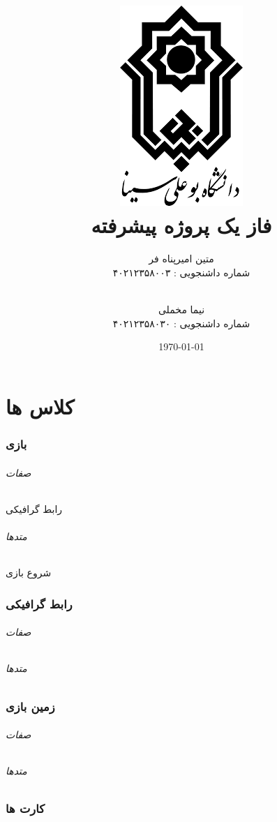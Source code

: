 \documentclass[pdf,titlepage,a4paper]{report}
\title{\includegraphics[scale=0.5]{Graphics/BASU_Logo_header.png} \\ \Huge{فاز یک پروژه پیشرفته}}
\author{متین امیرپناه فر \\ شماره داشنجویی : ۴۰۲۱۲۳۵۸۰۰۳  \and \\ نیما مخملی \\ شماره داشنجویی : ۴۰۲۱۲۳۵۸۰۳۰}
\date{\today}
\begin{document}
	\maketitle
	\tableofcontents
	
	\begin{abstract}
	\end{abstract}



	\part{کلاس ها}
		
	\newpage
	\section{بازی}
	\paragraph{صفات}
	\subparagraph{رابط گرافیکی}
	\paragraph{متدها}
	\subparagraph{شروع بازی}
	
	
	\newpage
	\section{رابط گرافیکی}
	\paragraph{صفات}
	\paragraph{متدها}
	
	
	\newpage
	\section{زمین بازی}
	\paragraph{صفات}
	\paragraph{متدها}
	
	
	\newpage
	\section{کارت ها}
\end{document}
